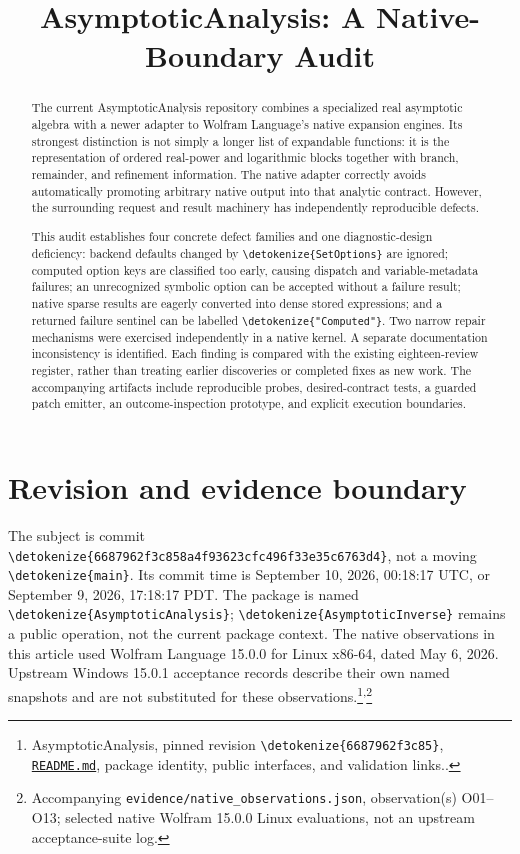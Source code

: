 \documentclass[11pt]{article}
\title{AsymptoticAnalysis: A Native-Boundary Audit}
\author{}\date{}
\newcommand{\code}[1]{{\ttfamily\expandafter\nolinkurl\expandafter{\detokenize{#1}}}}
\newcommand{\repo}{https://github.com/VladimirReshetnikov/Asymptotic/blob/6687962f3c858a4f93623cfc496f33e35c6763d4/}
\newcommand{\src}[2]{\footnote{AsymptoticAnalysis, pinned revision \code{6687962f3c85}, \href{\repo#1}{\nolinkurl{#1}}, #2.}}
\newcommand{\obs}[1]{\footnote{Accompanying \nolinkurl{evidence/native_observations.json}, observation(s) #1; selected native Wolfram 15.0.0 Linux evaluations, not an upstream acceptance-suite log.}}
\begin{document}
\maketitle
\vspace{-2.5em}
\begin{abstract}
The current AsymptoticAnalysis repository combines a specialized real asymptotic algebra with a newer adapter to Wolfram Language's native expansion engines. Its strongest distinction is not simply a longer list of expandable functions: it is the representation of ordered real-power and logarithmic blocks together with branch, remainder, and refinement information. The native adapter correctly avoids automatically promoting arbitrary native output into that analytic contract. However, the surrounding request and result machinery has independently reproducible defects.

This audit establishes four concrete defect families and one diagnostic-design deficiency: backend defaults changed by \code{SetOptions} are ignored; computed option keys are classified too early, causing dispatch and variable-metadata failures; an unrecognized symbolic option can be accepted without a failure result; native sparse results are eagerly converted into dense stored expressions; and a returned failure sentinel can be labelled \code{"Computed"}. Two narrow repair mechanisms were exercised independently in a native kernel. A separate documentation inconsistency is identified. Each finding is compared with the existing eighteen-review register, rather than treating earlier discoveries or completed fixes as new work. The accompanying artifacts include reproducible probes, desired-contract tests, a guarded patch emitter, an outcome-inspection prototype, and explicit execution boundaries.
\end{abstract}

\section*{Revision and evidence boundary}
The subject is commit \code{6687962f3c858a4f93623cfc496f33e35c6763d4}, not a moving \code{main}. Its commit time is September 10, 2026, 00:18:17 UTC, or September 9, 2026, 17:18:17 PDT. The package is named \code{AsymptoticAnalysis}; \code{AsymptoticInverse} remains a public operation, not the current package context. The native observations in this article used Wolfram Language 15.0.0 for Linux x86-64, dated May 6, 2026. Upstream Windows 15.0.1 acceptance records describe their own named snapshots and are not substituted for these observations.\src{README.md}{package identity, public interfaces, and validation links.}\textsuperscript{,}\obs{O01--O13}
\end{document}
